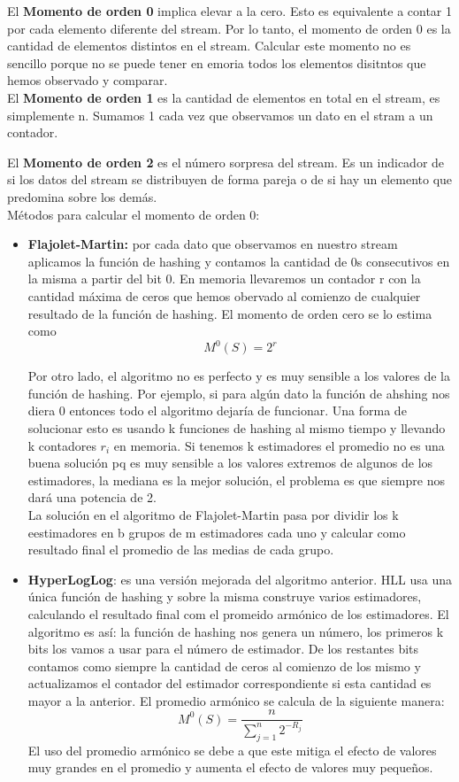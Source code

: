 \documentclass[titlepage,a4paper]{article}
\begin{document}
El \textbf{Momento de orden 0} implica elevar a la cero. Esto es equivalente a contar 1 por cada elemento diferente del stream. Por lo tanto, el momento de orden 0 es la cantidad de elementos distintos en el stream. Calcular este momento no es sencillo porque no se puede tener en emoria todos los elementos disitntos que hemos observado y comparar. \\

El \textbf{Momento de orden 1} es la cantidad de elementos en total en el stream, es simplemente n. Sumamos 1 cada vez que observamos un dato en el stram a un contador. 

El \textbf{Momento de orden 2} es el número sorpresa del stream. Es un indicador de si los datos del stream se distribuyen de forma pareja o de si hay un elemento que predomina sobre los demás. \\

Métodos para calcular el momento de orden 0: 
\begin{itemize}
\item \textbf{Flajolet-Martin:} por cada dato que observamos en nuestro stream aplicamos la función de hashing y contamos la cantidad de 0s consecutivos en la misma a partir del bit 0. En memoria llevaremos un contador r con la cantidad máxima de ceros que hemos obervado al comienzo de cualquier resultado de la función de hashing.  El momento de orden cero se lo estima como $$M^0(S) = 2 ^r$$  

Por otro lado, el algoritmo no es perfecto y  es muy sensible a los valores de la función de hashing. Por ejemplo, si para algún dato la función de ahshing nos diera 0 entonces todo el algoritmo dejaría de funcionar. Una forma de solucionar esto es usando k funciones de hashing al mismo tiempo y llevando k contadores $r_i$ en memoria. Si tenemos k estimadores el promedio no es una buena solución pq es muy sensible a los valores extremos de algunos de los estimadores, la mediana es la mejor solución, el problema es que siempre nos dará una potencia de 2.\\

La solución en el algoritmo de Flajolet-Martin pasa por dividir los k eestimadores en b grupos de m estimadores cada uno y calcular como resultado final el promedio de las medias de cada grupo. 


\item \textbf{HyperLogLog}: es una versión mejorada del algoritmo anterior. HLL usa una única función de hashing y sobre la misma construye varios estimadores, calculando el resultado final com el promeido armónico de los estimadores. El algoritmo es así: la función de hashing nos genera un número, los primeros k bits los vamos a usar para el número de estimador. De los restantes bits contamos como siempre la cantidad de ceros al comienzo de los mismo y actualizamos el contador del estimador correspondiente si esta cantidad es mayor a la anterior. El promedio armónico se calcula de la siguiente manera: $$M^0(S) = \frac{n}{\sum_{j=1}^n 2^{-R_j}} $$ El uso del promedio armónico se debe a que este mitiga el efecto de valores muy grandes en el promedio y aumenta el efecto de valores muy pequeños. 
\end{itemize}
\end{document}
